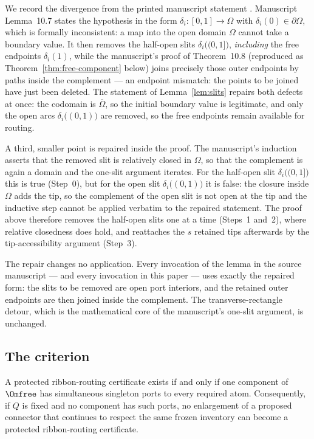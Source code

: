 \begin{remark}\label{rem:repair}
We record the divergence from the printed manuscript statement \cite{MWman}. Manuscript
Lemma~10.7 states the hypothesis in the form
$\delta_i\colon[0,1]\to\Omega$ with $\delta_i(0)\in\partial\Omega$, which is formally
inconsistent: a map into the open domain $\Omega$ cannot take a boundary value. It then
removes the half-open slits $\delta_i\bigl((0,1]\bigr)$, \emph{including} the free
endpoints $\delta_i(1)$, while the manuscript's proof of Theorem~10.8 (reproduced as
Theorem~\ref{thm:free-component} below) joins precisely those outer endpoints by paths
inside the complement --- an endpoint mismatch: the points to be joined have just been
deleted. The statement of Lemma~\ref{lem:slits} repairs both defects at once: the
codomain is $\overline{\Omega}$, so the initial boundary value is legitimate, and only
the open arcs $\delta_i\bigl((0,1)\bigr)$ are removed, so the free endpoints remain
available for routing.

A third, smaller point is repaired inside the proof. The manuscript's induction asserts
that the removed slit is relatively closed in $\Omega$, so that the complement is again
a domain and the one-slit argument iterates. For the half-open slit
$\delta_i\bigl((0,1]\bigr)$ this is true (Step~0), but for the open slit
$\delta_i\bigl((0,1)\bigr)$ it is false: the closure inside $\Omega$ adds the tip, so
the complement of the open slit is not open at the tip and the inductive step cannot be
applied verbatim to the repaired statement. The proof above therefore removes the
half-open slits one at a time (Steps~1 and~2), where relative closedness does hold, and
reattaches the $s$ retained tips afterwards by the tip-accessibility argument (Step~3).

The repair changes no application. Every invocation of the lemma in the source
manuscript --- and every invocation in this paper --- uses exactly the repaired form:
the slits to be removed are open port interiors, and the retained outer endpoints are
then joined inside the complement. The transverse-rectangle detour, which is the
mathematical core of the manuscript's one-slit argument, is unchanged.
\end{remark}

\subsection{The criterion}\label{subsec:D-criterion}

\begin{theorem}
\label{thm:free-component}
A protected ribbon-routing certificate exists if and only if one component of $\Omfree$
has simultaneous singleton ports to every required atom.  Consequently, if
$Q$ is fixed and no component has such ports, no enlargement of a proposed
connector that continues to respect the same frozen inventory can become a
protected ribbon-routing certificate.
\end{theorem}

